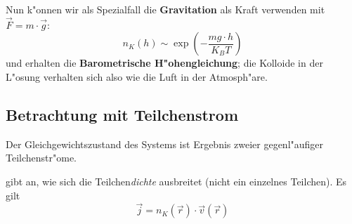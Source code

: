 \abs
Nun k"onnen wir als Spezialfall die \textbf{Gravitation} als Kraft
verwenden mit $\vec F = m \cdot \vec g$:
\begin{equation}
   \label{eqn_barometrische-hoehenformel-thermo}
   n_K(h) \sim 
\exp \left ( - \frac{mg \cdot h}{K_B T} \right )
\end{equation}
und erhalten die \textbf{Barometrische
H"ohengleichung}; die Kolloide
in der L"osung verhalten sich also wie die Luft in der Atmosph"are.




\subsection{Betrachtung mit Teilchenstrom}
\label{kap_betrachtung-mit-teilchenstrom}

Der Gleichgewichtszustand des Systems ist Ergebnis zweier
gegenl"aufiger Teilchenstr"ome.

\begin{Def}
gibt an, wie sich die Teilchen\emph{dichte} ausbreitet (nicht
ein einzelnes Teilchen).
Es gilt
\begin{equation}
   \label{eqn_def_teilchenstrom}
   \vec j = n_K(\vec r) \cdot \vec v ( \vec r )
\end{equation}
\end{Def}

